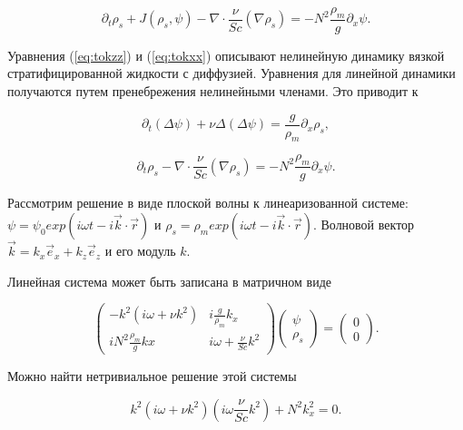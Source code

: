 \begin{equation}
    \partial_t \rho_s + J(\rho_s,\psi) - \nabla \cdot \frac{\nu}{Sc} (\nabla \rho_s) = -N^2 \frac{\rho_m}{g}\partial_x \psi.
    \label{eq:tokxx}
\end{equation}

Уравнения (\ref{eq:tokzz}) и (\ref{eq:tokxx}) описывают нелинейную динамику вязкой стратифицированной жидкости с диффузией. Уравнения для линейной динамики получаются путем пренебрежения нелинейными членами. Это приводит к

\begin{equation}
    \partial_t(\Delta \psi) + \nu \Delta (\Delta \psi) = \frac{g}{\rho_m} \partial_x \rho_s,
\end{equation}

\begin{equation}
    \partial_t \rho_s - \nabla \cdot \frac{\nu}{Sc} (\nabla \rho_s) = -N^2 \frac{\rho_m}{g}\partial_x \psi.
\end{equation}

Рассмотрим решение в виде плоской волны к линеаризованной системе: $\psi = \psi_0 exp(i\omega t - i \vec{k} \cdot \vec{r})$ и $\rho_s=\rho_m exp(i\omega t - i \vec{k}\cdot \vec{r})$. Волновой вектор $\vec{k}=k_x \vec{e}_x + k_z \vec{e}_z$ и его модуль $k$.

Линейная система может быть записана в матричном виде

\begin{equation}
    \left(\begin{array}{cc} -k^2(i\omega + \nu k^2) & i \frac{g}{\rho_m}k_x
    \\[15pt] iN^2 \frac{\rho_m}{g}kx & i\omega + \frac{\nu}{Sc} k^2 \end{array}\right)
    \left(\begin{array}{c}\psi \\[15pt] \rho_s\end{array}\right) = 
    \left(\begin{array}{c}0 \\[15pt] 0\end{array}\right).
\end{equation}

Можно найти нетривиальное решение этой системы

\begin{equation}
    k^2 \left( i\omega + \nu k^2 \right) \left(i \omega \frac{\nu}{Sc} k^2 \right) + N^2 k^2_x = 0.
\end{equation}

